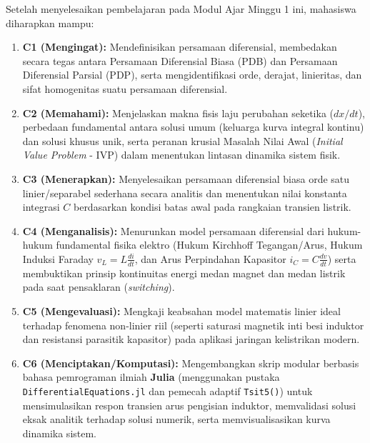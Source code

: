 \documentclass[11pt,a4paper]{article}
\theoremstyle{definition}
\begin{document}
\begin{tcolorbox}[colback=blue!5!white,colframe=headercolor,title=\textbf{Capaian Pembelajaran Khusus (Sub-CPMK 1)}]
Setelah menyelesaikan pembelajaran pada Modul Ajar Minggu 1 ini, mahasiswa diharapkan mampu:
\begin{enumerate}[leftmargin=*]
    \item \textbf{C1 (Mengingat):} Mendefinisikan persamaan diferensial, membedakan secara tegas antara Persamaan Diferensial Biasa (PDB) dan Persamaan Diferensial Parsial (PDP), serta mengidentifikasi orde, derajat, linieritas, dan sifat homogenitas suatu persamaan diferensial.
    \item \textbf{C2 (Memahami):} Menjelaskan makna fisis laju perubahan seketika ($dx/dt$), perbedaan fundamental antara solusi umum (keluarga kurva integral kontinu) dan solusi khusus unik, serta peranan krusial Masalah Nilai Awal (\textit{Initial Value Problem} - IVP) dalam menentukan lintasan dinamika sistem fisik.
    \item \textbf{C3 (Menerapkan):} Menyelesaikan persamaan diferensial biasa orde satu linier/separabel sederhana secara analitis dan menentukan nilai konstanta integrasi $C$ berdasarkan kondisi batas awal pada rangkaian transien listrik.
    \item \textbf{C4 (Menganalisis):} Menurunkan model persamaan diferensial dari hukum-hukum fundamental fisika elektro (Hukum Kirchhoff Tegangan/Arus, Hukum Induksi Faraday $v_L = L \frac{di}{dt}$, dan Arus Perpindahan Kapasitor $i_C = C \frac{dv}{dt}$) serta membuktikan prinsip kontinuitas energi medan magnet dan medan listrik pada saat pensaklaran (\textit{switching}).
    \item \textbf{C5 (Mengevaluasi):} Mengkaji keabsahan model matematis linier ideal terhadap fenomena non-linier riil (seperti saturasi magnetik inti besi induktor dan resistansi parasitik kapasitor) pada aplikasi jaringan kelistrikan modern.
    \item \textbf{C6 (Menciptakan/Komputasi):} Mengembangkan skrip modular berbasis bahasa pemrograman ilmiah \textbf{Julia} (menggunakan pustaka \texttt{DifferentialEquations.jl} dan pemecah adaptif \texttt{Tsit5()}) untuk mensimulasikan respon transien arus pengisian induktor, memvalidasi solusi eksak analitik terhadap solusi numerik, serta memvisualisasikan kurva dinamika sistem.
\end{enumerate}
\end{tcolorbox}

\vspace{0.3cm}
\tableofcontents
\vspace{0.5cm}
\end{document}
